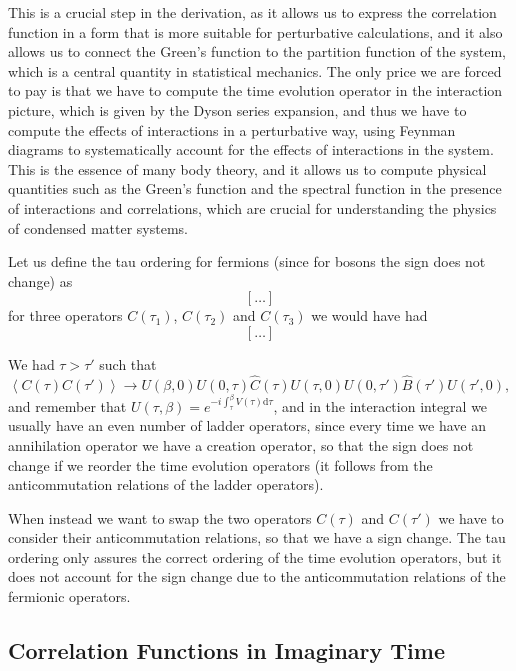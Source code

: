 This is a crucial step in the derivation, as it allows us to express the correlation function in a form that is more suitable for perturbative calculations, and it also allows us to connect the Green's function to the partition function of the system, which is a central quantity in statistical mechanics. The only price we are forced to pay is that we have to compute the time evolution operator in the interaction picture, which is given by the Dyson series expansion, and thus we have to compute the effects of interactions in a perturbative way, using Feynman diagrams to systematically account for the effects of interactions in the system. This is the essence of many body theory, and it allows us to compute physical quantities such as the Green's function and the spectral function in the presence of interactions and correlations, which are crucial for understanding the physics of condensed matter systems.






\begin{remark}
    Let us define the tau ordering for fermions (since for bosons the sign does not change) as
    \[
        [\dots]
    \]
    for three operators \(C(\tau_1)\), \(C(\tau_2)\) and \(C(\tau_3)\) we would have had
    \[
        [\dots]
    \]

    We had \(\tau > \tau'\) such that
    \[
        \left\langle C(\tau) C(\tau') \right\rangle \to U(\beta, 0) U(0,\tau)\hat{C}(\tau) U(\tau,0)U(0,\tau') \hat{B}(\tau') U(\tau',0),
    \]
    and remember that \(U(\tau, \beta) = e^{- i \int_{\tau}^{\beta} V(\tau) \mathrm{d}\tau}\), and in the interaction integral we usually have an even number of ladder operators, since every time we have an annihilation operator we have a creation operator, so that the sign does not change if we reorder the time evolution operators (it follows from the anticommutation relations of the ladder operators).

    When instead we want to swap the two operators \(C(\tau)\) and \(C(\tau')\) we have to consider their anticommutation relations, so that we have a sign change. The tau ordering only assures the correct ordering of the time evolution operators, but it does not account for the sign change due to the anticommutation relations of the fermionic operators.
\end{remark}

\subsection{Correlation Functions in Imaginary Time}

